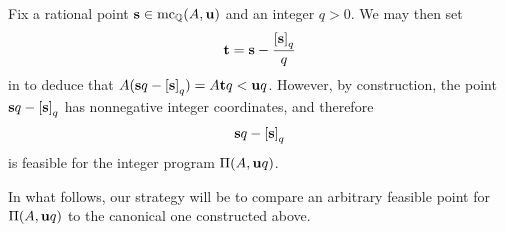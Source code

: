 \documentclass[11pt]{amsart}
\begin{document}

\begin{remark}
\label{canonical-feasible: R}
Fix a rational point $\mathbf{s} \in \operatorname{mc}_{\mathbb{Q}}(A, \mathbf{u})$ and an integer $q>0$.  We may then set \[ \mathbf{t} = \mathbf{s} - \frac{\left[ \mathbf{s} \right]_q}{q} \] in  to deduce that $A (\mathbf{s} q - \left[ \mathbf{s} \right]_q ) =  A\mathbf{t}q <  \mathbf{u}q$.  However, by construction, the point $\mathbf{s}q - \left[ \mathbf{s} \right]_q$ has nonnegative integer coordinates, and therefore \[ \mathbf{s}q - \left[ \mathbf{s} \right]_q\] is feasible for the integer program $\Pi(A, \mathbf{u}q)$. 
\end{remark}

 In what follows, our strategy will be to compare an arbitrary feasible point for $\Pi(A, \mathbf{u}q)$ to the canonical one constructed above.   



%
\end{document}
